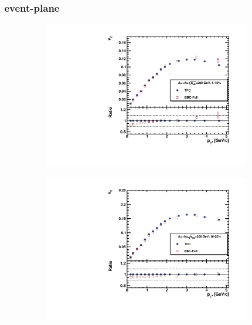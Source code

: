 \FloatBarrier
\subsubsection{\BBC\ event-plane}

\begin{figure}[ht]
    \begin{subfigure}{.49\textwidth}
        \centering
        \includegraphics[width=1.\linewidth]{Figures/v2_CH_BBC_pt_cent1.pdf}
    \end{subfigure}
    \begin{subfigure}{.49\textwidth}
        \centering
        \includegraphics[width=1.\linewidth]{Figures/v2_CH_BBC_pt_cent2.pdf}
    \end{subfigure}
    \\

\end{figure}
